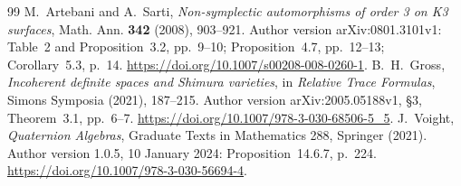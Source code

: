\documentclass[11pt]{article}
\theoremstyle{definition}
\theoremstyle{remark}
\begin{document}
\begin{thebibliography}{99}
 M.~Artebani and A.~Sarti, \emph{Non-symplectic automorphisms of order 3 on K3 surfaces}, Math. Ann. \textbf{342} (2008), 903--921. Author version arXiv:0801.3101v1: Table~2 and Proposition~3.2, pp.~9--10; Proposition~4.7, pp.~12--13; Corollary~5.3, p.~14. \url{https://doi.org/10.1007/s00208-008-0260-1}.
 B.~H.~Gross, \emph{Incoherent definite spaces and Shimura varieties}, in \emph{Relative Trace Formulas}, Simons Symposia (2021), 187--215. Author version arXiv:2005.05188v1, \S3, Theorem~3.1, pp.~6--7. \url{https://doi.org/10.1007/978-3-030-68506-5_5}.
 J.~Voight, \emph{Quaternion Algebras}, Graduate Texts in Mathematics 288, Springer (2021). Author version 1.0.5, 10 January 2024: Proposition~14.6.7, p.~224. \url{https://doi.org/10.1007/978-3-030-56694-4}.
\end{thebibliography}
\end{document}
